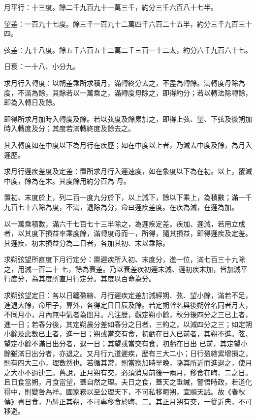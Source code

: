 \begin{pinyinscope}
 月平行：十三度。餘二千九百九十一萬三千，約分三千六百八十七半。



 望差：一百九十七度。餘三千一百九十二萬四千六百二十五半，約分三千九百三十四。



 弦差：九十八度。餘五千六百五十二萬二千三百一十二太，約分六千九百六十七。



 日衰：一十八、小分九。



 求月行入轉度：以朔差乘所求積月，滿轉終分去之，不盡為轉餘。滿轉度母除為度，不滿為餘，其餘若以一萬乘之，滿轉度母除之，即得約分；若以轉法除轉餘，即為入轉日及餘。



 即得所求月加時入轉度及餘。若以弦度及餘累加之，即得上弦、望、下弦及後朔加時入轉度及分；其度若滿轉終度及餘去之。



 其入轉度如在中度以下為月行在疾歷；如在中度以上者，乃減去中度及餘，為月入遲歷。



 求月行遲疾差度及定差：置所求月行入遲速度，如在象度以下為在初。以上，覆減中度，餘為在末。其度餘用約分百為
 母。



 置初、末度於上，列二百一度九分於下，以上減下，餘以下乘上，為積數；滿一千九百七十六除為度，不滿，退除為分，命曰遲疾差度。在疾為減，在遲為加。



 以一萬乘積數，滿六千七百七十三半除之，為遲疾定差。疾加、遲減，若用立成者，以其度下損益率乘度餘，滿轉度母而一，所得，隨其損益，即得遲疾及定差。其遲疾、初末損益分為二日者，各加其初、末以乘除。



 求朔弦望所直度下月行定分：置遲疾所入初、末度分，進一位，滿七百三十九除之，用減一百二十
 七，餘為衰差。乃以衰差疾初遲末減、遲初疾末加，皆加減平行度分，為其度所直月行定分。其度以百命為分。



 求朔弦望定日：各以日躔盈縮、月行遲疾定差加減經朔、弦、望小餘，滿若不足，進退大餘，命甲子，算外，各得定日日辰及餘。若定朔幹名與後朔幹名同者月大，不同月小，月內無中氣者為閏月。凡注歷，觀定朔小餘，秋分後四分之三已上者，進一日；若春分後，其定朔晨分差如春分之日者，三約之，以減四分之三；如定朔小餘及此數已上者，進一日；朔或當交有食，初虧在日入已前者，其朔不進。弦、望定小餘不滿日出分者，退一日；其望或當交有食，初虧在日出
 已前，其定望小餘雖滿日出分者，亦退之。又月行九道遲疾，歷有三大二小；日行盈縮累增損之，則有四大三小，理數然也。若循其常，則當察加時早晚，隨其所近而進退之，使月之大小不過連三。舊說，正月朔有交，必須消息前後一兩月，移食在晦、二之日。且日食當朔，月食當望，蓋自然之理。夫日之食，蓋天之垂誡，警悟時政，若道化得中，則變咎為祥。國家務以至公理天下，不可私移晦朔，宜順天誡。故《春秋傳》書日食，乃糾正其朔，不可專移食於晦、二。其正月朔有交，一從近典，不可移避。




\end{pinyinscope}
